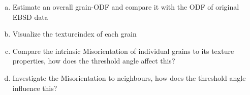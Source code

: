 \begin{frame}



  \begin{Exercise}
    \begin{enumerate}[a)]
    \item Estimate an overall grain-ODF and compare it with the ODF of
      original EBSD data
    \item Visualize the textureindex of each grain
    \item Compare the intrinsic Misorientation of individual grains to its
      texture properties, how does the threshold angle affect this?
    \item Investigate the Misorientation to neighbours, how does the threshold
      angle influence this?
    \end{enumerate}
  \end{Exercise}

\end{frame}



